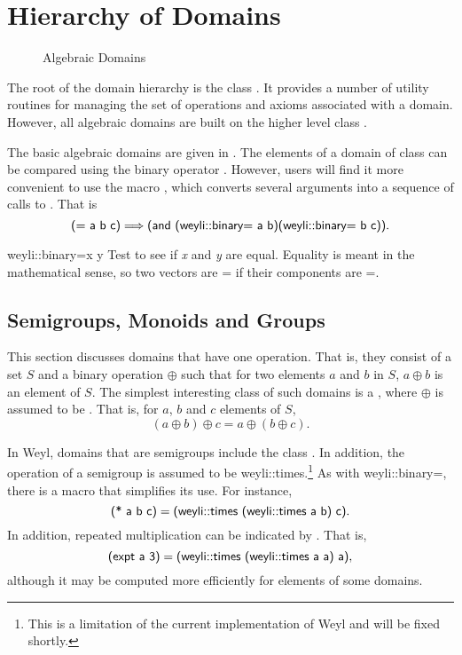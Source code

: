 \section{Hierarchy of Domains}
\label{Domain:Hierarchy:Sec}

\begin{figure}
\begin{center}
\end{center}
\caption{Algebraic Domains\label{Algebraic:Domains:Fig}}
\end{figure}

The root of the domain hierarchy is the class .  It
provides a number of utility routines for managing the set of
operations and axioms associated with a domain.  However, all
algebraic domains are built on the higher level class .

The basic algebraic domains are given in
.  The elements of a domain of class
 can be compared using the binary operator
.  However, users will find it more convenient
to use the macro \keylisp{=}, which converts several arguments into a
sequence of calls to .  That is
\[
\mbox{\sf (= a b c)} \Longrightarrow
 \mbox{\sf (and (weyli::binary= a b)(weyli::binary= b c))}.
\]

\begin{genericdef}{weyli::binary=}{x y}
Test to see if {\em x} and {\em y} are equal.  Equality is meant in
the mathematical sense, so two vectors are {\sf =} if their
components are {\sf =}.
\end{genericdef}

\subsection{Semigroups, Monoids and Groups}

This section discusses domains that have one operation.  That is, they
consist of a set $S$ and a binary operation $\oplus$ such that for two
elements $a$ and $b$ in $S$, $a \oplus b$ is an element of $S$.  The
simplest interesting class of such domains is a ,
where $\oplus$ is assumed to be .  That is, for $a$,
$b$ and $c$ elements of $S$,
\[
(a \oplus b) \oplus c = a \oplus (b \oplus c).
\]

In Weyl, domains that are semigroups include the class
.  In addition, the operation of a {\sf semigroup}
is assumed to be {\sf weyli::times}.\footnote{This is a limitation of
the current implementation of Weyl and will be fixed shortly.}  As
with {\sf weyli::binary=}, there is a macro {\sf *} that simplifies its
use.  For instance,
\[
\mbox{\sf (* a b c)} = 
\mbox{\sf (weyli::times (weyli::times a b) c)}.
\]
In addition, repeated multiplication can be indicated by
.  That is,
\[
\mbox{\sf (expt a 3)} = 
\mbox{\sf (weyli::times (weyli::times a a) a)},
\]
although it may be computed more efficiently for elements of some domains.

